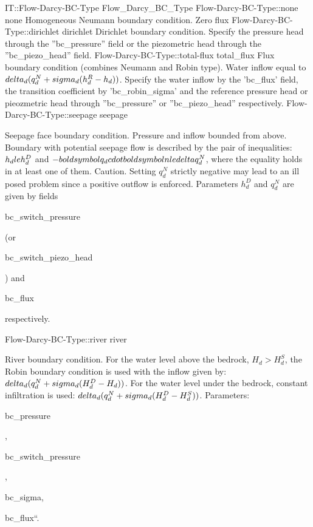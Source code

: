 \begin{SelectionType}
	{IT::Flow-Darcy-BC-Type}
	{Flow{\_}Darcy{\_}BC{\_}Type}
	{}
		\SelectionItem
			{Flow-Darcy-BC-Type::none}
			{none}
			{{{Homogeneous Neumann boundary condition.
Zero flux}%
}}
		\SelectionItem
			{Flow-Darcy-BC-Type::dirichlet}
			{dirichlet}
			{{{Dirichlet boundary condition.
Specify the pressure head through the ''bc{\_}pressure'' field or the piezometric head through the ''bc{\_}piezo{\_}head'' field.}%
}}
		\SelectionItem
			{Flow-Darcy-BC-Type::total-flux}
			{total{\_}flux}
			{{{Flux boundary condition (combines Neumann and Robin type). Water inflow equal to }{$ \\delta_d(q_d^N + \\sigma_d (h_d^R - h_d) )$}{. Specify the water inflow by the 'bc{\_}flux' field, the transition coefficient by 'bc{\_}robin{\_}sigma' and the reference pressure head or pieozmetric head through ''bc{\_}pressure'' or ''bc{\_}piezo{\_}head'' respectively.}%
}}
		\SelectionItem
			{Flow-Darcy-BC-Type::seepage}
			{seepage}
			{{{Seepage face boundary condition.
Pressure and inflow bounded from above.
Boundary with potential seepage flow is described by the pair of inequalities: }{$h_d \\le h_d^D$}{ and }{$ -\\boldsymbol q_d\\cdot\\boldsymbol n \\le \\delta q_d^N$}{, where the equality holds in at least one of them.
Caution.
Setting }{$q_d^N$}{ strictly negative may lead to an ill posed problem since a positive outflow is enforced.
Parameters }{$h_d^D$}{ and }{$q_d^N$}{ are given by fields }\begin{ttfamily}bc{\_}switch{\_}pressure\end{ttfamily}{ (or }\begin{ttfamily}bc{\_}switch{\_}piezo{\_}head\end{ttfamily}{) and }\begin{ttfamily}bc{\_}flux\end{ttfamily}{ respectively.}%
}}
		\SelectionItem
			{Flow-Darcy-BC-Type::river}
			{river}
			{{{River boundary condition.
For the water level above the bedrock, }{$H_d > H_d^S$}{, the Robin boundary condition is used with the inflow given by: }{ $ \\delta_d(q_d^N + \\sigma_d(H_d^D - H_d) )$}{. For the water level under the bedrock, constant infiltration is used: }{ $ \\delta_d(q_d^N + \\sigma_d(H_d^D - H_d^S) )$}{. Parameters: }\begin{ttfamily}bc{\_}pressure\end{ttfamily}{, }\begin{ttfamily}bc{\_}switch{\_}pressure\end{ttfamily}{,  }\begin{ttfamily}bc{\_}sigma,\end{ttfamily}{bc{\_}flux``.}%
}}
\end{SelectionType}
